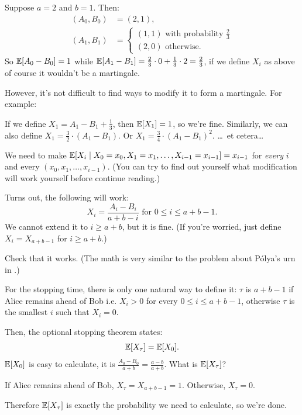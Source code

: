 \begin{example}
	Suppose $a=2$ and $b=1$. Then:
	\begin{align*}
		(A_0, B_0) &= (2, 1), \\
		(A_1, B_1) &= \begin{cases}
			(1, 1)\text{ with probability }\frac{2}{3} \\
			(2, 0)\text{ otherwise.}
		\end{cases}
	\end{align*}
	So $\mathbb E[A_0-B_0]=1$ while $\mathbb E[A_1-B_1]=\frac{2}{3}\cdot 0+\frac{1}{3}\cdot 2=\frac{2}{3}$,
	if we define $X_i$ as above of course it wouldn't be a martingale.

	However, it's not difficult to find ways to modify it to form a martingale. For example:
	\begin{itemize}
		\ii If we define $X_1 = A_1-B_1+\frac{1}{3}$, then $\mathbb E[X_1]=1$, so we're fine.
		\ii Similarly, we can also define $X_1 = \frac{3}{2}\cdot(A_1-B_1)$.
		\ii Or $X_1 = \frac{3}{4}\cdot (A_1-B_1)^2$.
		\ii \dots\ et cetera\dots
	\end{itemize}
\end{example}

We need to make $\mathbb E[X_i \mid X_0=x_0, X_1=x_1, \dots, X_{i-1}=x_{i-1}]=x_{i-1}$
for \emph{every} $i$ and every $(x_0, x_1, \dots, x_{i-1})$. (You can try to find out yourself what
modification will work yourself before continue reading.)

Turns out, the following will work:
\[
	X_i = \frac{A_i-B_i}{a+b-i}\text{ for }0 \leq i \leq a+b-1.
\]
We cannot extend it to $i \geq a+b$, but it is fine.
(If you're worried, just define $X_i = X_{a+b-1}$ for $i \geq a+b$.)
\begin{exercise}
	Check that it works. (The math is very similar to the problem about P\'{o}lya's urn in
	.)
\end{exercise}
For the stopping time, there is only one natural way to define it:
$\tau$ is $a+b-1$ if Alice remains ahead of Bob i.e. $X_i>0$ for every $0 \leq i \leq a+b-1$,
otherwise $\tau$ is the smallest $i$ such that $X_i=0$.

Then, the optional stopping theorem states:
\[ \mathbb E[X_\tau] = \mathbb E[X_0]. \]
$\mathbb E[X_0]$ is easy to calculate, it is $\frac{A_0-B_0}{a+b}=\frac{a-b}{a+b}$.
What is $\mathbb E[X_\tau]$?
\begin{itemize}
	\ii If Alice remains ahead of Bob, $X_\tau = X_{a+b-1} = 1$.
	\ii Otherwise, $X_\tau = 0$.
\end{itemize}
Therefore $\mathbb E[X_\tau]$ is exactly the probability we need to calculate, so we're done.


